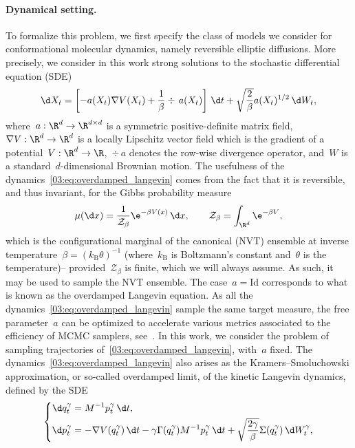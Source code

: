     \paragraph{Dynamical setting.}
    To formalize this problem, we first specify the class of models we consider for conformational molecular dynamics, namely reversible elliptic diffusions.
    More precisely, we consider in this work strong solutions to the stochastic differential equation (SDE)
    \begin{equation}
        \label{03:eq:overdamped_langevin}
        \d X_t = \left[-a(X_t)\nabla V(X_t) +\frac1\beta \div\,a(X_t)\right]\,\d t + \sqrt{\frac2\beta}a(X_t)^{1/2}\,\d W_t,
    \end{equation}
    where~$a:\R^d\to\R^{d\times d}$ is a symmetric positive-definite matrix field,~$\nabla V:\R^d\to\R^d$ is a locally Lipschitz vector field which is the gradient of a potential~$V:\R^d\to\R$,~$\div\,a$ denotes the row-wise divergence operator, and~$W$ is a standard~$d$-dimensional Brownian motion.
    The usefulness of the dynamics~\eqref{03:eq:overdamped_langevin} comes from the fact that it is reversible, and thus invariant, for the Gibbs probability measure
    \begin{equation}
        \label{03:eq:gibbs_measure}
        \mu(\d x) = \frac1{\mathcal Z_\beta}\e^{-\beta V(x)}\,\d x,\qquad \mathcal Z_\beta = \int_{\R^d} \e^{-\beta V},
    \end{equation}
    which is the configurational marginal of the canonical (NVT) ensemble at inverse temperature~$\beta=(k_{\mathrm{B}}\theta)^{-1}$ (where~$k_{\mathrm{B}}$ is Boltzmann's constant and~$\theta$ is the temperature)-- provided~$\mathcal Z_\beta$ is finite, which we will always assume.
    As such, it may be used to sample the NVT ensemble. The case~$a=\mathrm{Id}$ corresponds to what is known as the overdamped Langevin equation.
    As all the dynamics~\eqref{03:eq:overdamped_langevin} sample the same target measure, the free parameter~$a$ can be optimized to accelerate various metrics associated to the efficiency of MCMC samplers, see~\cite{LPRSS24,LSS24,CTZ24}.
    In this work, we consider the problem of sampling trajectories of~\eqref{03:eq:overdamped_langevin}, with~$a$ fixed.
    The dynamics~\eqref{03:eq:overdamped_langevin} also arises as the Kramers--Smoluchowski approximation, or so-called overdamped limit, of the kinetic Langevin dynamics, defined by the SDE
    \begin{equation}
        \label{03:eq:underdamped_langevin}
        \left\{\begin{aligned}
            \d q^\gamma_t &= M^{-1}p^\gamma_t\,\d t,\\
            \d p^\gamma_t &= -\nabla V(q^\gamma_t)\,\d t - \gamma \Gamma(q^\gamma_t)M^{-1}p^\gamma_t\,\d t + \sqrt{\frac{2\gamma}{\beta}}\Sigma(q^\gamma_t)\,\d W^\gamma_t,
        \end{aligned}
        \right.
    \end{equation}
